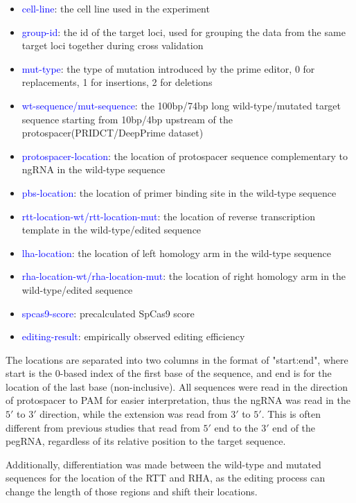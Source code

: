 \begin{itemize}[itemsep=-0mm]
    \item \textcolor{blue}{cell-line}: the cell line used in the experiment
    \item \textcolor{blue}{group-id}: the id of the target loci, used for grouping the data from the same target loci together during cross validation
    \item \textcolor{blue}{mut-type}: the type of mutation introduced by the prime editor, 0 for replacements, 1 for insertions, 2 for deletions
    \item \textcolor{blue}{wt-sequence/mut-sequence}: the 100bp/74bp long wild-type/mutated target sequence starting from 10bp/4bp upstream of the protospacer(PRIDCT/DeepPrime dataset)
    \item \textcolor{blue}{protospacer-location}: the location of protospacer sequence complementary to ngRNA in the wild-type sequence 
    \item \textcolor{blue}{pbs-location}: the location of primer binding site in the wild-type sequence
    \item \textcolor{blue}{rtt-location-wt/rtt-location-mut}: the location of reverse transcription template in the wild-type/edited sequence
    \item \textcolor{blue}{lha-location}: the location of left homology arm in the wild-type sequence
    \item \textcolor{blue}{rha-location-wt/rha-location-mut}: the location of right homology arm in the wild-type/edited sequence
    \item \textcolor{blue}{spcas9-score}: precalculated SpCas9 score
    \item \textcolor{blue}{editing-result}: empirically observed editing efficiency
\end{itemize}

The locations are separated into two columns in the format of "start:end", where start is the 0-based index of the first base of the sequence, and end is for the location of the last base (non-inclusive). All sequences were read in the direction of protospacer to PAM for easier interpretation, thus the ngRNA was read in the $5'$ to $3'$ direction, while the extension was read from $3'$ to $5'$. This is often different from previous studies that read from $5'$ end to the $3'$ end of the pegRNA, regardless of its relative position to the target sequence. 

Additionally, differentiation was made between the wild-type and mutated sequences for the location of the RTT and RHA, as the editing process can change the length of those regions and shift their locations.

